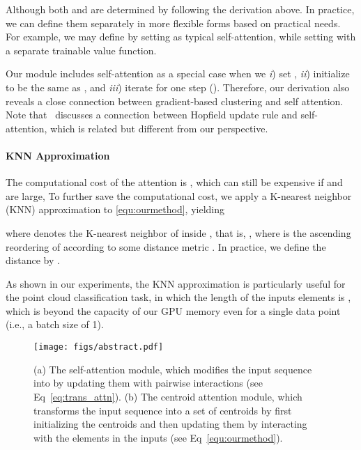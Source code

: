 \documentclass[english]{article}
\begin{document}
 
 Although 
 both  and  are determined by  following the derivation above. In practice, we can define them separately in more flexible forms based on practical needs. 
 For example, we may define    by setting 
   as typical self-attention, while setting  with a separate trainable value function. 








Our module includes  self-attention as a special case when we  \emph{i}) set , \emph{ii}) initialize    to be the same as , and \emph{iii}) iterate for one step (). 
Therefore, our derivation also reveals a  close connection between gradient-based clustering and self attention. Note that~\citet{ramsauer2020hopfield} discusses a connection between Hopfield update rule and self-attention, 
which is related but different from our perspective. 




\paragraph{KNN Approximation}
The computational cost of the attention is , which can still be expensive if  and  are large, To further save the computational cost,  we apply a K-nearest neighbor (KNN) approximation to \eqref{equ:ourmethod}, yielding 

where  denotes the  K-nearest neighbor of  inside , that is, 
, where  is the ascending reordering of  according to some distance metric . 
In practice, we define the distance by . 

As shown in our experiments, the KNN approximation is particularly useful for the point cloud classification task, 
in which the length of the inputs elements is 
, which is beyond the capacity of our GPU memory even  for a single data point (i.e., a batch size of 1). 


\begin{figure}[t]
    \centering
    \texttt{[image: figs/abstract.pdf]}
    \caption{(a) The self-attention module, 
    which  modifies the input sequence  into  by updating them  with pairwise interactions (see Eq~\eqref{eq:trans_attn}). (b) The centroid attention module,  which transforms the input sequence  into a set of centroids  by  first initializing the centroids and then updating them by interacting with the elements in the inputs (see Eq~\eqref{equ:ourmethod}).  }    
    \label{fig:abstract} 
\end{figure}
\end{document}
